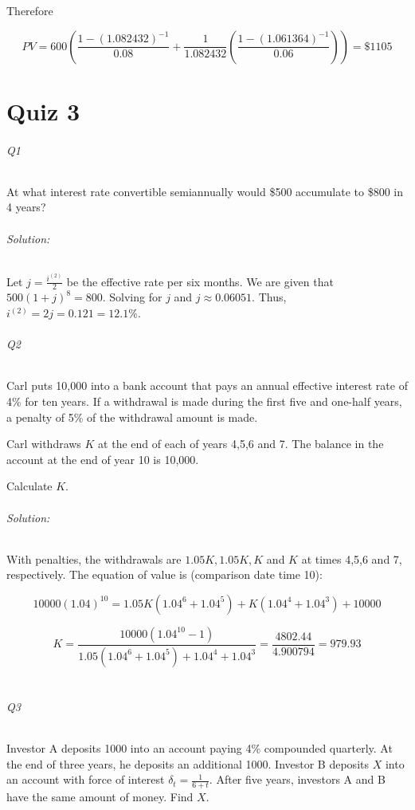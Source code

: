 \documentclass[a4paper, 11pt, twoside]{article}
\begin{document}
Therefore

\[PV = 600\left(\frac{1-(1.082432)^{-1}}{0.08}+\frac1{1.082432}\left(\frac{1-(1.061364)^{-1}}{0.06}\right)\right)=\$1105\]

\part{Quiz 3}

\paragraph{Q1} At what interest rate convertible semiannually would \$500 accumulate to \$800 in 4 years?\\

\paragraph{Solution:} Let $j=\frac{i^{(2)}}{2}$ be the effective rate per six months. We are given that $500(1+j)^8=800$. Solving for $j$ and $j\approx 0.06051$. Thus, $i^{(2)}=2j=0.121=12.1\%$.\\

\paragraph{Q2} Carl puts 10,000 into a bank account that pays an annual effective interest rate of 4\% for ten years. If a withdrawal is made during the first five and one-half years, a penalty of 5\% of the withdrawal amount is made.

Carl withdraws $K$ at the end of each of years 4,5,6 and 7. The balance in the account at the end of year 10 is 10,000.

Calculate $K$.\\

\paragraph{Solution:} With penalties, the withdrawals are $1.05K, 1.05K, K$ and $K$ at times 4,5,6 and 7, respectively. The equation of value is (comparison date time 10):

\[10000(1.04)^{10}=1.05K(1.04^6+1.04^5) + K(1.04^4+1.04^3)+10000\]

\[K=\frac{10000(1.04^{10}-1)}{1.05(1.04^6+1.04^5)+1.04^4+1.04^3}=\frac{4802.44}{4.900794}=979.93\]\\

\paragraph{Q3} Investor A deposits 1000 into an account paying 4\% compounded quarterly. At the end of three years, he deposits an additional 1000. Investor B deposits $X$ into an account with force of interest $\delta_t=\frac{1}{6+t}$. After five years, investors A and B have the same amount of money. Find $X$.\\
\end{document}

